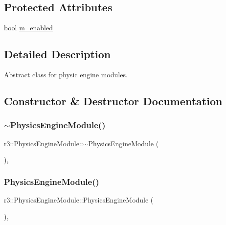 \subsection*{Protected Attributes}
\begin{DoxyCompactItemize}
\item 
bool \mbox{\hyperlink{classr3_1_1_physics_engine_module_a9697a77e77dc5dd5990b16876ad413bf}{m\+\_\+enabled}}
\end{DoxyCompactItemize}


\subsection{Detailed Description}
Abstract class for physic engine modules. 

\subsection{Constructor \& Destructor Documentation}
\mbox{\label{classr3_1_1_physics_engine_module_af2b491daa564a15ec5362780c885e2ca}} 
\subsubsection{\texorpdfstring{$\sim$\+Physics\+Engine\+Module()}{~PhysicsEngineModule()}}
{\footnotesize\ttfamily r3\+::\+Physics\+Engine\+Module\+::$\sim$\+Physics\+Engine\+Module (\begin{DoxyParamCaption}{ }\end{DoxyParamCaption})\hspace{0.3cm}{\ttfamily [virtual]}, {\ttfamily [default]}}

\mbox{\label{classr3_1_1_physics_engine_module_a37f69469023611b549a09c2afc23df20}} 
\subsubsection{\texorpdfstring{Physics\+Engine\+Module()}{PhysicsEngineModule()}}
{\footnotesize\ttfamily r3\+::\+Physics\+Engine\+Module\+::\+Physics\+Engine\+Module (\begin{DoxyParamCaption}{ }\end{DoxyParamCaption})\hspace{0.3cm}{\ttfamily [explicit]}, {\ttfamily [protected]}}



